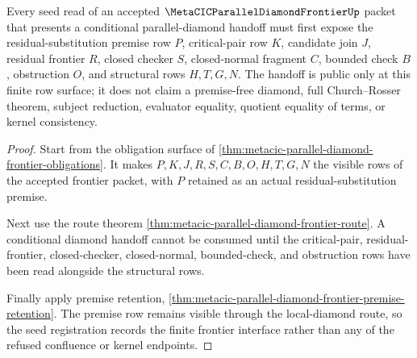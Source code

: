 \begin{theorem}
\label{thm:metacic-parallel-diamond-frontier-seed-registration}
Every seed read of an accepted $\MetaCICParallelDiamondFrontierUp$ packet that presents a conditional parallel-diamond handoff must first expose the residual-substitution premise row $P$, critical-pair row $K$, candidate join $J$, residual frontier $R$, closed checker $S$, closed-normal fragment $C$, bounded check $B$, obstruction $O$, and structural rows $H,T,G,N$. The handoff is public only at this finite row surface; it does not claim a premise-free diamond, full Church--Rosser theorem, subject reduction, evaluator equality, quotient equality of terms, or kernel consistency.
\end{theorem}
\begin{proof}
Start from the obligation surface of \autoref{thm:metacic-parallel-diamond-frontier-obligations}. It makes $P,K,J,R,S,C,B,O,H,T,G,N$ the visible rows of the accepted frontier packet, with $P$ retained as an actual residual-substitution premise.

Next use the route theorem \autoref{thm:metacic-parallel-diamond-frontier-route}. A conditional diamond handoff cannot be consumed until the critical-pair, residual-frontier, closed-checker, closed-normal, bounded-check, and obstruction rows have been read alongside the structural rows.

Finally apply premise retention, \autoref{thm:metacic-parallel-diamond-frontier-premise-retention}. The premise row remains visible through the local-diamond route, so the seed registration records the finite frontier interface rather than any of the refused confluence or kernel endpoints.
\end{proof}

